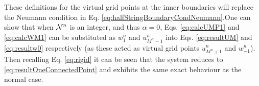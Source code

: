 \SWcomment[***$\rightarrow$] These definitions for the virtual grid points at the inner boundaries will replace the Neumann condition in Eq. \eqref{eq:halfStringBoundaryCondNeumann}.\SWcomment[$\leftarrow$***] %
One can show that when $\mathcal{N}^n$ is an integer, and thus $\alpha = 0$, Eqs. \eqref{eq:calcUMP1} and \eqref{eq:calcWM1} can be substituted as $w_1^n$ and $u_{M^n-1}^n$ into Eqs. \eqref{eq:resultUM} and \eqref{eq:resultw0} respectively (as these acted as virtual grid points $u_{M^n+1}^n$ and $w_{-1}^n$). Then recalling Eq. \eqref{eq:rigid} it can be seen that the system reduces to \eqref{eq:resultOneConnectedPoint} and exhibits the same exact behaviour as the normal case. %


